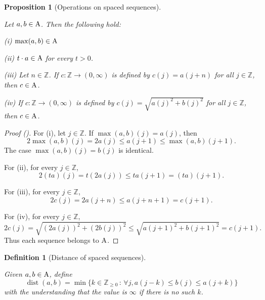 \documentclass[12pt,reqno]{amsart}
\newcommand{\auto}{{({\tiny\faCar})}}
\theoremstyle{plain}
\newtheorem{proposition}[theorem]{Proposition}
\newtheorem{definition}[theorem]{Definition}
\numberwithin{equation}{section}
\theoremstyle{remark}
\newcommand{\uses}[1]{}
\newcommand{\usesdefs}[1]{}
\newcommand{\leanok}{}
\newcommand{\lean}[1]{}
\newcommand{\Z}{{\mathbb Z}}
\DeclareMathOperator{\dist}{dist}
\begin{document}
\begin{proposition}[Operations on spaced sequences]\label{Operations on spaced sequences}\uses{}\usesdefs{multiplicatively spaced monotone sequences}
\lean{Auto.max_mem_A,Auto.smul_mem_A,Auto.shift_mem_A,Auto.sqrt_sq_add_sq_mem_A}
\leanok
    Let $a,b\in {\rm A}$. Then the following hold:

    (i) $\max(a,b)\in {\rm A}$

    (ii) $t\cdot a\in {\rm A}$ for every $t>0$.

    (iii) Let $n\in\mathbb{Z}$. If $c:\Z\to(0,\infty)$ is defined by $c(j)=a(j+n)$ for all $j\in\mathbb{Z}$, then $c\in {\rm A}$.

    (iv) If $c:\Z\to (0,\infty)$ is defined by $c(j)=\sqrt{a(j)^2+b(j)^2}$ for all $j\in\Z$, then $c\in {\rm A}$.
\end{proposition}
\begin{proof}[Proof \auto]
For (i), let $j\in\Z$. If $\max(a,b)(j)=a(j)$, then
\[
2\max(a,b)(j)=2a(j)\le a(j+1)\le\max(a,b)(j+1).
\]
The case $\max(a,b)(j)=b(j)$ is identical.

For (ii), for every $j\in\Z$,
\[
2(ta)(j)=t(2a(j))\le ta(j+1)=(ta)(j+1).
\]

For (iii), for every $j\in\Z$,
\[
2c(j)=2a(j+n)\le a(j+n+1)=c(j+1).
\]

For (iv), for every $j\in\Z$,
\[
2c(j)=\sqrt{(2a(j))^2+(2b(j))^2}
\le\sqrt{a(j+1)^2+b(j+1)^2}=c(j+1).
\]
Thus each sequence belongs to ${\rm A}$.
\end{proof}


\begin{definition}[Distance of spaced sequences]\label{Distance of spaced sequences}\uses{}\usesdefs{multiplicatively spaced monotone sequences}
\lean{Auto.WithinSequenceDistance,Auto.SequenceDistance}
Given $a,b\in {\rm A}$, define
\begin{equation}\label{auto:spaced-sequence-distance}
    \dist(a,b)=\min\{k\in\mathbb{Z}_{\ge 0}\,:\,\forall j, a(j-k)\le b(j)\le a(j+k)\}
\end{equation}
with the understanding that the value is $\infty$ if there is no such $k$.
\end{definition}
\end{document}
